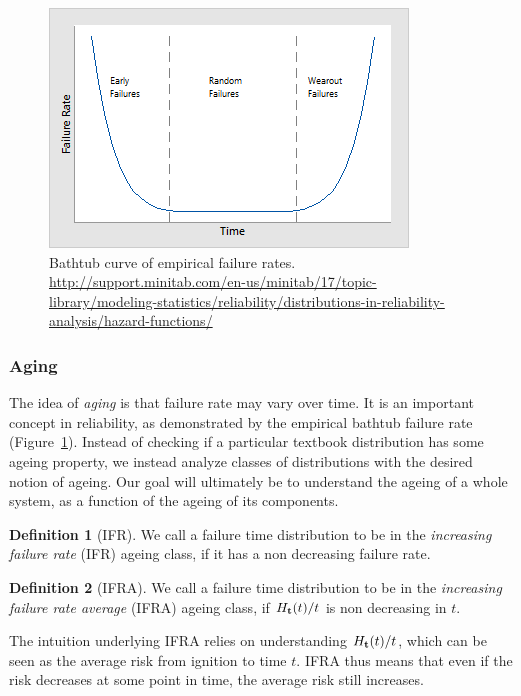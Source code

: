 \documentclass[12pt,a4paper]{report}
\theoremstyle{plain}
\theoremstyle{definition}
\newtheorem{definition}{Definition}
\begin{document}
\begin{figure}[ht]
\centering
\includegraphics[width=0.5\linewidth]{art/bathtub_curve}
\caption[Bathtub empirical hazard curve]{Bathtub curve of empirical failure rates. \newline
\url{http://support.minitab.com/en-us/minitab/17/topic-library/modeling-statistics/reliability/distributions-in-reliability-analysis/hazard-functions/}}
\label{fig:bathtub}
\end{figure}




\subsubsection{Aging}
The idea of \emph{aging} is that failure rate may vary over time. It is an important concept in reliability, as demonstrated by the empirical bathtub failure rate (Figure~\ref{fig:bathtub}).
Instead of checking if a particular textbook distribution has some ageing property, we instead analyze classes of distributions with the desired notion of ageing.
Our goal will ultimately be to understand the ageing of a whole system, as a function of the ageing of its components.

\begin{definition}[IFR]
We call a failure time distribution to be in the \emph{increasing failure rate} (IFR) ageing class, if it has a non decreasing failure rate.
\end{definition}


\begin{definition}[IFRA]
We call a failure time distribution to be in the \emph{increasing failure rate average} (IFRA) ageing class, if 
$H_{\mathbf{t}} (t)/t$ is non decreasing in $t$.
\end{definition}
The intuition underlying IFRA relies on understanding $H_{\mathbf{t}} (t)/t$, which can be seen as the average risk from ignition to time $t$. 
IFRA thus means that even if the risk decreases at some point in time, the average risk still increases. 
\end{document}
